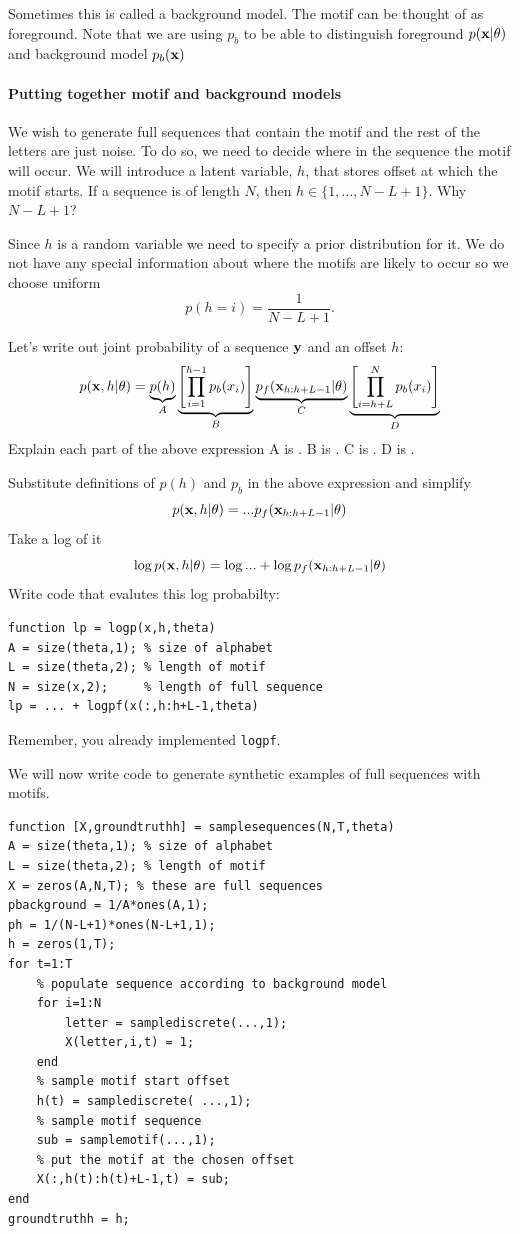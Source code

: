 \documentclass{article}
\begin{document}
{Sometimes this is called a background model. The motif can be thought of as foreground.
Note that we are using $p_b$ to be able to distinguish foreground $p(\mathbf{x}|\theta)$ and background model $p_b(\mathbf{x})$


\paragraph{Putting together motif and background models}
We wish to generate full sequences that contain the motif and the rest of the letters are just noise.
To do so, we need to decide where in the sequence the motif will occur. We will introduce a latent variable, $h$, that
stores offset at which the motif starts.  If a sequence is of length $N$, then $h \in  \{1,\dots,N-L+1\}$.
Why $N-L+1$? \answer

Since $h$ is a random variable we need to specify a prior distribution for it. 
We do not have any special information about where the motifs are likely to occur so we choose uniform
\[
p(h = i) = \frac{1}{N-L+1}.
\]

Let's write out joint probability of a sequence $\mathbf{y}$ and an offset $h$:
\[
p(\mathbf{x},h|\theta) = \underbrace{p(h)}_A \underbrace{\left[\prod_{i=1}^{h-1} p_b(x_i)\right]}_{B}\underbrace{p_f(\mathbf{x}_{h:h+L-1}|\theta)}_{C}\underbrace{\left[\prod_{i=h+L}^{N} p_b(x_i)\right]}_{D}
\]
Explain each part of the above expression
A is \answer.
B is \answer.
C is \answer.
D is \answer.

Substitute definitions of $p(h)$ and $p_b$ in the above expression and simplify
\[
p(\mathbf{x},h|\theta) = ... p_f(\mathbf{x}_{h:h+L-1}|\theta)
\]
Take a log of it
\[
\log p(\mathbf{x},h|\theta) = \log ... + \log p_f(\mathbf{x}_{h:h+L-1}|\theta)
\]
Write code that evalutes this log probabilty:
\begin{verbatim}
function lp = logp(x,h,theta)
A = size(theta,1); % size of alphabet
L = size(theta,2); % length of motif
N = size(x,2);     % length of full sequence
lp = ... + logpf(x(:,h:h+L-1,theta)
\end{verbatim}
Remember, you already implemented \verb|logpf|.

We will now write code to generate synthetic examples of full sequences with motifs.
\begin{verbatim}
function [X,groundtruthh] = samplesequences(N,T,theta)
A = size(theta,1); % size of alphabet
L = size(theta,2); % length of motif
X = zeros(A,N,T); % these are full sequences
pbackground = 1/A*ones(A,1);
ph = 1/(N-L+1)*ones(N-L+1,1);
h = zeros(1,T);
for t=1:T
    % populate sequence according to background model
    for i=1:N
        letter = samplediscrete(...,1);
        X(letter,i,t) = 1;
    end
    % sample motif start offset
    h(t) = samplediscrete( ...,1);
    % sample motif sequence
    sub = samplemotif(...,1);
    % put the motif at the chosen offset
    X(:,h(t):h(t)+L-1,t) = sub;
end
groundtruthh = h;
\end{verbatim}

}
\end{document}
